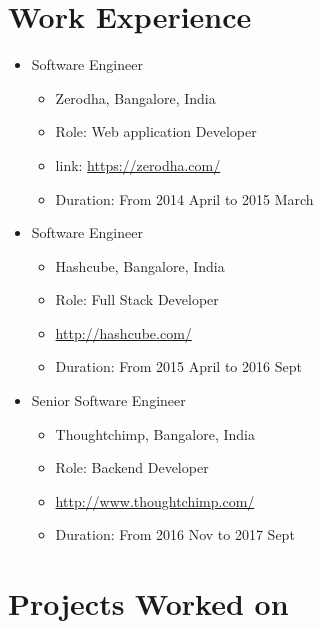 \documentclass[11pt,a4paper]{moderncv}
\begin{document}
\section{Work Experience}
    \begin{itemize}
        \item Software Engineer
        \begin{itemize}
            \item Zerodha, Bangalore, India
            \item Role: Web application Developer
            \item link: {\url{https://zerodha.com/}}
            \item Duration: From 2014 April to 2015 March 
        \end{itemize}
    \end{itemize}
    \begin{itemize}
        \item Software Engineer
        \begin{itemize}
            \item Hashcube, Bangalore, India
            \item Role: Full Stack Developer  
            \item {\url{http://hashcube.com/}}
            \item Duration: From 2015 April to 2016 Sept
        \end{itemize}
    \end{itemize}
    \begin{itemize}
        \item Senior Software Engineer
        \begin{itemize}
            \item Thoughtchimp, Bangalore, India
            \item Role: Backend Developer
            \item {\url{http://www.thoughtchimp.com/}}
            \item Duration: From 2016 Nov to 2017 Sept
        \end{itemize}
    \end{itemize}
 
\pagebreak
\section{Projects Worked on}
\end{document}
